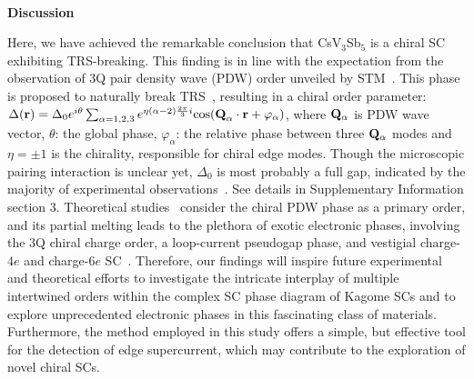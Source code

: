\documentclass[article,reprint,amsmath,amssymb,superscriptaddress,longbibliography]{revtex4-1}
\begin{document}
 

~\\
\noindent\textbf{Discussion}

\noindent
Here, we have achieved the remarkable conclusion that CsV$_3$Sb$_5$ is a chiral SC exhibiting TRS-breaking. This finding is in line with the expectation from the observation of 3Q pair density wave (PDW) order unveiled by STM~\cite{GaoHJ2021Nature}. This phase is proposed to naturally break TRS~\cite{WangZQ2022NC,ZhouY2022PRL}, resulting in a chiral order parameter: $\Delta(\textbf{r})=\Delta_0 e^{i\theta} \sum_{\alpha=1,2,3} e^{\eta(\alpha-2)\frac{2\pi}{3}i} \textrm{cos}(\textbf{Q}_{\bf\alpha}\cdot\textbf{r} +\varphi_\alpha)$, where $\bf Q_{\bf \alpha}$ is PDW wave vector, $\theta$: the global phase, $\varphi_\alpha$: the relative phase between three $\bf Q_{\bf \alpha}$ modes and $\eta=\pm1$ is the chirality, responsible for chiral edge modes. Though the microscopic pairing interaction is unclear yet, $\Delta_0$ is most probably a full gap, indicated by the majority of experimental observations~\cite{LuoJL2021CPL,Yuan2021SCPMA,Shibauchi2023NC,Okazaki2023Nature,FengDL2021PRL}. See details in Supplementary Information section 3. Theoretical studies~\cite{WangZQ2022NC,ZhouY2022PRL} consider the chiral PDW phase as a primary order, and its partial melting leads to the plethora of exotic electronic phases, involving the 3Q chiral charge order, a loop-current pseudogap phase, and vestigial charge-$4e$ and charge-$6e$ SC~\cite{WangJ2022Arxiv}. Therefore, our findings will inspire future experimental and theoretical efforts to investigate the intricate interplay of multiple intertwined orders within the complex SC phase diagram of Kagome SCs and to explore unprecedented electronic phases in this fascinating class of materials. Furthermore, the method employed in this study offers a simple, but effective tool for the detection of edge supercurrent, which may contribute to the exploration of novel chiral SCs.






\end{document}

